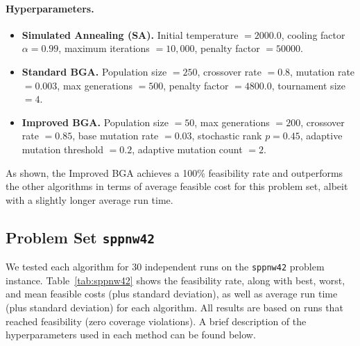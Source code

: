 \documentclass[12pt]{article}
\begin{document}
\paragraph{Hyperparameters.}
\vspace{-0.75em}
\begin{itemize}
    \item \textbf{Simulated Annealing (SA).} 
    Initial temperature $= 2000.0$, 
    cooling factor $\alpha = 0.99$, 
    maximum iterations $= 10,000$, 
    penalty factor $= 50000$. 
    \item \textbf{Standard BGA.}
    Population size $= 250$, 
    crossover rate $= 0.8$, 
    mutation rate $= 0.003$, 
    max generations $= 500$, 
    penalty factor $= 4800.0$, 
    tournament size $= 4$.
    \item \textbf{Improved BGA.}
    Population size $= 50$, 
    max generations $= 200$, 
    crossover rate $= 0.85$, 
    base mutation rate $= 0.03$, 
    stochastic rank $p = 0.45$, 
    adaptive mutation threshold $= 0.2$, 
    adaptive mutation count $= 2$.
\end{itemize}

\noindent
As shown, the Improved BGA achieves a 100\% feasibility rate and outperforms the other algorithms in terms of average feasible cost for this problem set, albeit with a slightly longer average run time.


\subsection{Problem Set \texttt{sppnw42}}
\label{subsec:sppnw42}

We tested each algorithm for 30 independent runs on the \texttt{sppnw42} problem instance. 
Table~\ref{tab:sppnw42} shows the feasibility rate, along with best, worst, and mean feasible costs (plus standard deviation), as well as average run time (plus standard deviation) for each algorithm. 
All results are based on runs that reached feasibility (zero coverage violations). 
A brief description of the hyperparameters used in each method can be found below.

\vspace{1em}
\end{document}
